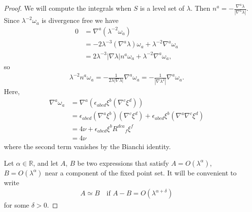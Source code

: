 \documentclass[a4paper,11pt,reqno]{amsart}
\newcommand{\Reals}{\mathbb{R}}
\theoremstyle{plain}
\numberwithin{equation}{section}
\begin{document}
\begin{proof}
We will compute the integrals when $S$ is a level set of $\lambda$. Then 
$n^a = - \frac{\nabla^a \lambda}{|\nabla^a \lambda|}$. 
Since $\lambda^{-2} \omega_a$ is divergence free we have
\begin{align}
0 &= \nabla^a (\lambda^{-2} \omega_a)  \\
&= -2 \lambda^{-3} (\nabla^a \lambda) \omega_a + \lambda^{-2} \nabla^a \omega_a \\
&= 2 \lambda^{-3} |\nabla \lambda|  n^a \omega_a + \lambda^{-2} \nabla^a \omega_a,  
\end{align}
so
\begin{align}
\lambda^{-2} n^a \omega_a 
= - \frac{1}{2\lambda|\nabla\lambda| } \nabla^a \omega_a
= - \frac{1}{|\nabla\lambda^2| } \nabla^a \omega_a.
\end{align}
Here,   
\begin{align}
\nabla^a \omega_a
&= \nabla^a(\epsilon_{abcd} \xi^b (\nabla^c \xi^d) ) \\ 
&= 
\epsilon_{abcd} (\nabla^a\xi^b) (\nabla^c \xi^d)
+ \epsilon_{abcd} \xi^b (\nabla^a \nabla^c \xi^d) \\
&= 
4\nu
+ \epsilon_{abcd} \xi^b R^{dca}{}_f \xi^f \\
&= 4\nu
\end{align}
where the second term vanishes by the Bianchi identity.


Let $\alpha \in \Reals$, and let $A$, $B$ be two expressions that satisfy $A = O(\lambda^{\alpha})$, $B = O(\lambda^{\alpha})$ near a component of the fixed point set. It will be convenient to write 
\begin{align} \label{eq:simeqdef} 
A \simeq B \quad \text{if $A - B = O(\lambda^{\alpha + \delta})$}
\end{align} 
for some $\delta > 0$. 



\end{proof}
\end{document}
